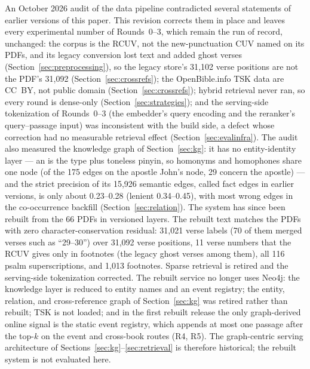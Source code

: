 An October 2026 audit of the data pipeline contradicted several
statements of earlier versions of this paper. This revision corrects
them in place and leaves every experimental number of Rounds~0--3, which
remain the run of record, unchanged: the corpus is the RCUV, not the
new-punctuation CUV named on its PDFs, and its legacy conversion lost
text and added ghost verses (Section~\ref{sec:preprocessing}), so the
legacy store's 31{,}102 verse positions are not the PDF's 31{,}092
(Section~\ref{sec:crossrefs}); the OpenBible.info TSK data are CC~BY, not
public domain (Section~\ref{sec:crossrefs}); hybrid retrieval never ran,
so every round is dense-only (Section~\ref{sec:strategies}); and the
serving-side tokenization of Rounds~0--3 (the embedder's query encoding
and the reranker's query--passage input) was inconsistent with the build
side, a defect whose correction had no measurable retrieval effect
(Section~\ref{sec:evalinfra}). The audit also measured the knowledge
graph of Section~\ref{sec:kg}: it has no entity-identity layer --- an
 is the type plus toneless pinyin, so homonyms and
homophones share one node (of the 175 edges on the apostle John's node,
29 concern the apostle) --- and the strict precision of its 15{,}926
semantic edges, called fact edges in earlier versions, is only about
0.23--0.28 (lenient 0.34--0.45), with most wrong edges in the
co-occurrence backfill (Section~\ref{sec:relation}). The system has
since been rebuilt from the
66 PDFs in versioned layers. The rebuilt text matches the PDFs with zero
character-conservation residual: 31{,}021 verse labels (70 of them merged
verses such as ``29--30'') over 31{,}092 verse positions, 11 verse numbers
that the RCUV gives only in footnotes (the legacy ghost verses among
them), all 116 psalm superscriptions, and 1{,}013 footnotes. Sparse
retrieval is retired and the serving-side tokenization corrected. The
rebuilt service
no longer uses Neo4j: the knowledge layer is reduced to entity names and
an event registry; the entity, relation, and cross-reference graph of
Section~\ref{sec:kg} was retired rather than rebuilt; TSK is not loaded;
and in the first rebuilt release the only graph-derived online signal is
the static event registry, which appends at most one passage after the
top-$k$ on the event and cross-book routes (R4, R5). The graph-centric
serving architecture of Sections~\ref{sec:kg}--\ref{sec:retrieval} is
therefore historical; the rebuilt system is not evaluated here.
